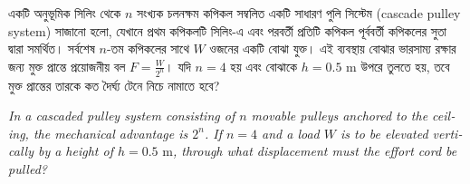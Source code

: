 \documentclass[12pt, a4paper]{article}
\begin{document}
\begin{tcolorbox}[questionbox={প্রশ্ন (Question) 49}]
\noindent
একটি অনুভূমিক সিলিং থেকে $n$ সংখ্যক চলনক্ষম কপিকল সম্বলিত একটি সাধারণ পুলি সিস্টেম (cascade pulley system) সাজানো হলো, যেখানে প্রথম কপিকলটি সিলিং-এ এবং পরবর্তী প্রতিটি কপিকল পূর্ববর্তী কপিকলের সুতা দ্বারা সমর্থিত। সর্বশেষ $n$-তম কপিকলের সাথে $W$ ওজনের একটি বোঝা যুক্ত। এই ব্যবস্থায় বোঝার ভারসাম্য রক্ষার জন্য মুক্ত প্রান্তে প্রয়োজনীয় বল $F = \frac{W}{2^n}$। যদি $n = 4$ হয় এবং বোঝাকে $h = 0.5\text{ m}$ উপরে তুলতে হয়, তবে মুক্ত প্রান্তের তারকে কত দৈর্ঘ্য টেনে নিচে নামাতে হবে?

\vspace{0.8em}
\begin{english}
\noindent\textit{\color{darkgray}
In a cascaded pulley system consisting of $n$ movable pulleys anchored to the ceiling, the mechanical advantage is $2^n$. If $n = 4$ and a load $W$ is to be elevated vertically by a height of $h = 0.5\text{ m}$, through what displacement must the effort cord be pulled?
}
\end{english}
\end{tcolorbox}
\end{document}
